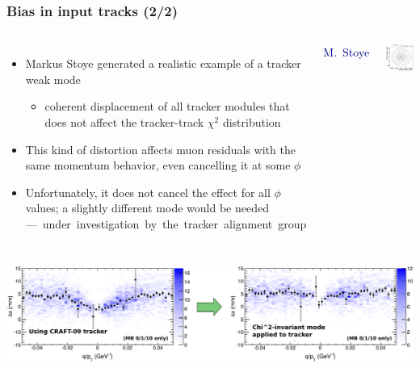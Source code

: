 \documentclass[compress]{beamer}
\begin{document}
\begin{frame}
\frametitle{Bias in input tracks (2/2)}

\begin{columns}
\begin{itemize}
\item Markus Stoye generated a realistic example of a tracker weak mode
\begin{itemize}
\item coherent displacement of all tracker modules that does not
  affect the tracker-track $\chi^2$ distribution
\end{itemize}

\item This kind of distortion affects muon residuals with the same
  momentum behavior, even cancelling it at some $\phi$

\item Unfortunately, it does not cancel the effect for all $\phi$
  values; a slightly different mode would be \mbox{needed--- under investigation by the tracker alignment group\hspace{-5 cm}}
\end{itemize}

\hfill \textcolor{darkblue}{M.~Stoye}

\includegraphics[width=\linewidth]{stoye_deformation.png}
\end{columns}

\vspace{0.25 cm}
\includegraphics[width=\linewidth]{trackerMP3_weakmode.pdf}
\end{frame}
\end{document}
